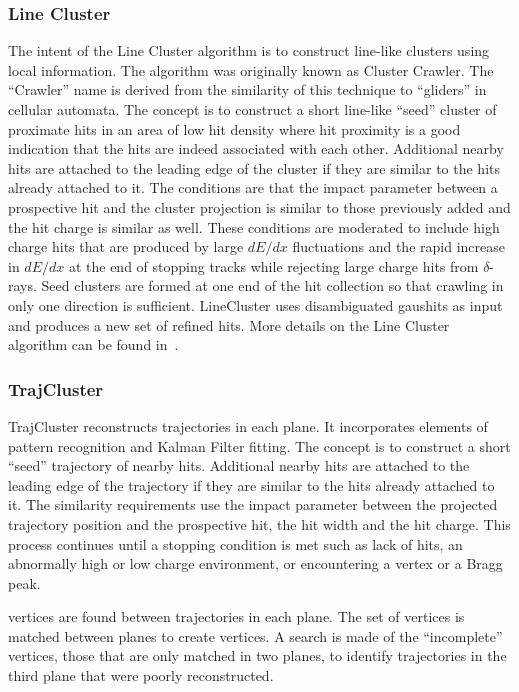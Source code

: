 \subsubsection{Line Cluster}\label{sec:LineCluster}
The intent of the Line Cluster algorithm is to construct \twod line-like clusters using local information. The algorithm was originally known as Cluster Crawler. The ``Crawler'' name is derived from the similarity of this technique to ``gliders'' in \twod cellular automata. The concept is to construct a short line-like ``seed'' cluster of proximate hits in an area of low hit density where hit proximity is a good indication that the hits are indeed associated with each other. Additional nearby hits are attached to the leading edge of the cluster if they are similar to the hits already attached to it. The conditions are that the impact parameter between a prospective hit and the cluster projection is similar to those previously added and the hit charge is similar as well. These conditions are moderated to include high charge hits that are produced by large $dE/dx$ fluctuations and the rapid increase in $dE/dx$ at the end of stopping tracks while rejecting large charge hits from $\delta$-rays.
Seed clusters are formed at one end of the hit collection so that crawling in only one direction is sufficient. LineCluster uses disambiguated gaushits as input and produces a new set of refined hits. More details on the Line Cluster algorithm can be found in~\cite{ref:linecluster}.

\subsubsection{TrajCluster}\label{sec:TrajCluster}
TrajCluster reconstructs \twod trajectories in each plane. It incorporates elements of pattern recognition and Kalman Filter fitting. The concept is to construct a short ``seed'' trajectory of nearby hits. Additional nearby hits are attached to the leading edge of the trajectory if they are similar to the hits already attached to it. The similarity requirements use the impact parameter between the projected trajectory position and the prospective hit, the hit width and the hit charge. This process continues until a stopping condition is met such as lack of hits, an abnormally high or low charge environment, or encountering a \twod vertex or a Bragg peak.

\twod vertices are found between trajectories in each plane. The set of \twod vertices is matched between planes to create \threed vertices. A search is made of the ``incomplete'' \threed vertices, those that are only matched in two planes, to identify trajectories in the third plane that were poorly reconstructed.

